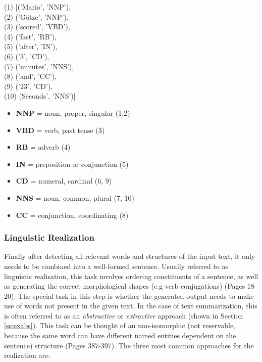 \begin{tcolorbox}\label{box:1}
	\begin{flushleft}
		(1) [('Mario', 'NNP'), \\
		(2) ('Götze', 'NNP'), \\
		(3) ('scored', 'VBD'),\\
		(4) ('fast', 'RB'),\\
		(5) ('after', 'IN'),\\
		(6) ('3', 'CD'),\\
		(7) ('minutes', 'NNS'), \\
		(8) ('and', 'CC'),\\
		(9) ('23', 'CD'),\\
		(10) (Seconds', 'NNS')]
	\end{flushleft}

	\begin{itemize}
		\item \textbf{NNP} = noun, proper, singular (1,2)
		\item \textbf{VBD} = verb, past tense (3)
		\item \textbf{RB} = adverb (4)
		\item \textbf{IN} = preposition or conjunction (5)
		\item \textbf{CD} = numeral, cardinal (6, 9)
		\item \textbf{NNS} = noun, common, plural (7, 10)
		\item \textbf{CC} = conjunction, coordinating (8)
	\end{itemize}
\end{tcolorbox}
\subsubsection{Linguistic Realization}

Finally after detecting all relevant words and structures of the input text, it only needs to be combined into a well-formed sentence. Usually referred to as linguistic realisation, this task involves ordering constituents of a sentence, as well as generating the correct morphological shapes (e.g verb conjugations) \cite{gatt} (Pages 18-20). The special task in this step is whether the generated output needs to make use of words not present in the given text. In the case of text summarization, this is often referred to as an \textit{abstractive} or \textit{extractive} approach (shown in Section \ref{ss:exabs}). This task can be thought of an non-isomorphic (not reservable, because the same word can have different named entities dependent on the sentence) structure \cite{ballesteros-etal-2015-data} (Pages 387-397). The three most common approaches for the realization are:

